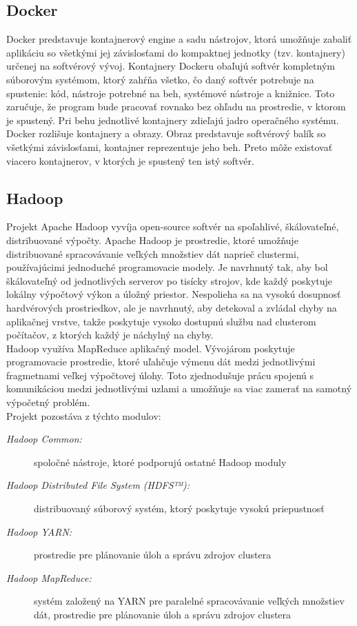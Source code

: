 \documentclass[12pt,twoside,color,cover,table]{fithesis3}
\begin{document}
\subsection{Docker}
Docker predstavuje kontajnerový engine a sadu nástrojov, ktorá umožňuje zabaliť aplikáciu so všetkými jej závislosťami do kompaktnej jednotky (tzv. kontajnery) určenej na softvérový vývoj. Kontajnery Dockeru 
obaľujú softvér kompletným súborovým systémom, ktorý zahŕňa všetko, čo daný softvér potrebuje na spustenie: kód, nástroje potrebné na beh, systémové nástroje a knižnice. Toto zaručuje, že program bude pracovať rovnako bez ohľadu na prostredie, v ktorom
je spustený.%
Pri behu jednotlivé kontajnery zdieľajú jadro operačného systému.
\\Docker rozlišuje kontajnery a obrazy. Obraz predstavuje softvérový balík so všetkými závislosťami, kontajner reprezentuje jeho beh. Preto môže existovať viacero kontajnerov, v ktorých je spustený ten istý
softvér.

\subsection{Hadoop}
Projekt Apache Hadoop vyvíja open-source softvér na spoľahlivé, škálovateľné, distribuované výpočty. Apache Hadoop je prostredie, ktoré umožňuje distribuované spracovávanie veľkých množstiev dát
naprieč clustermi, používajúcimi jednoduché programovacie modely. Je navrhnutý tak, aby bol škálovateľný od jednotlivých serverov po tisícky strojov, kde každý poskytuje lokálny výpočtový výkon a úložný priestor.
Nespolieha sa na vysokú dosupnosť hardvérových prostriedkov, ale je navrhnutý, aby detekoval a zvládal chyby na aplikačnej vrstve, takže poskytuje vysoko dostupnú službu nad clusterom počítačov, 
z ktorých každý je náchylný na chyby. %
\\Hadoop využíva MapReduce aplikačný model. Vývojárom poskytuje programovacie prostredie, ktoré uľahčuje výmenu dát medzi jednotlivými fragmetnami veľkej výpočtovej úlohy. Toto zjednodušuje
prácu spojenú s komunikáciou medzi jednotlivými uzlami a umožňuje sa viac zamerať na samotný výpočetný problém.
\\Projekt pozostáva z týchto modulov:
\begin{description}
\item[\emph{Hadoop Common:}] spoločné nástroje, ktoré podporujú ostatné Hadoop moduly
\item[\emph{Hadoop Distributed File System (HDFS™):}] distribuovaný súborový systém, ktorý poskytuje vysokú priepustnosť
\item[\emph{Hadoop YARN:}] prostredie pre plánovanie úloh a správu zdrojov clustera
\item[\emph{Hadoop MapReduce:}] systém založený na YARN pre paralelné spracovávanie veľkých množstiev dát, prostredie pre plánovanie úloh a správu zdrojov clustera
\end{description}
\end{document}

